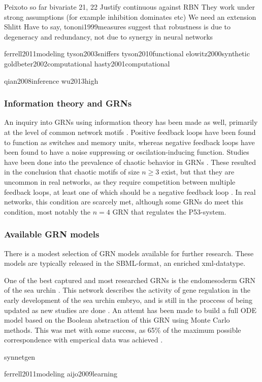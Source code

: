 \documentclass[../main.tex]{subfiles}
\begin{document}
Peixoto so far
bivariate 21, 22
Justify continuous against RBN
They work under strong assumptions (for example inhibition dominates etc) \cite{}
We need an extension
Shlitt
Have to say, tononi1999measures suggest that robustness is due to degeneracy and redundancy, not due to synergy in neural networks

ferrell2011modeling
tyson2003sniffers
tyson2010functional
elowitz2000synthetic
goldbeter2002computational
hasty2001computational

qian2008inference
wu2013high

\subsubsection{Information theory and GRNs}

An inquiry into GRNs using information theory has been made as well, primarily at the level of common network motifs \cite{zhang2012chaotic}.
Positive feedback loops have been found to function as switches and memory units, whereas negative feedback loops have been found to have a noise suppressing or oscilation-inducing function.
Studies have been done into the prevalence of chaotic behavior in GRNs \cite{zhang2012chaotic}.
These resulted in the conclusion that chaotic motifs of size $n\ge 3$ exist, but that they are uncommon in real networks, as they require competition between multiple feedback loops, at least one of which should be a negative feedback loop \cite{zhang2012chaotic}.
In real networks, this condition are scarcely met, although some GRNs do meet this condition, most notably the $n=4$ GRN that regulates the P53-system.

\subsubsection{Available GRN models}

There is a modest selection of GRN models available for further research.
These models are typically released in the SBML-format, an enriched xml-datatype.

One of the best captured and most researched GRNs is the endomesoderm GRN of the sea urchin \cite{bolouri2002modeling, kuhn2009monte}.
This network describes the activity of gene regulation in the early development of the sea urchin embryo, and is still in the proccess of being updated as new studies are done \cite{urchinmodel}.
An attemt has been made to build a full ODE model based on the Boolean abstraction of this GRN using Monte Carlo methods.
This was met with some success, as 65\% of the maximum possible correspondence with emperical data was achieved \cite{kuhn2009monte}.


synnetgen

ferrell2011modeling
aijo2009learning
\end{document}
